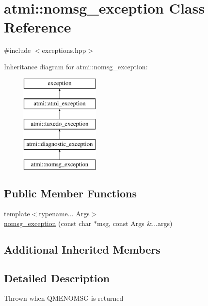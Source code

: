 \hypertarget{classatmi_1_1nomsg__exception}{\section{atmi\+:\+:nomsg\+\_\+exception Class Reference}
\label{classatmi_1_1nomsg__exception}
}


{\ttfamily \#include $<$exceptions.\+hpp$>$}

Inheritance diagram for atmi\+:\+:nomsg\+\_\+exception\+:\begin{figure}[H]
\begin{center}
\leavevmode
\includegraphics[height=5.000000cm]{classatmi_1_1nomsg__exception}
\end{center}
\end{figure}
\subsection*{Public Member Functions}
\begin{DoxyCompactItemize}
\item 
{\footnotesize template$<$typename... Args$>$ }\\\hyperlink{classatmi_1_1nomsg__exception_adf4039103c33fa16b63242cb7e129664}{nomsg\+\_\+exception} (const char $\ast$msg, const Args \&...args)
\end{DoxyCompactItemize}
\subsection*{Additional Inherited Members}


\subsection{Detailed Description}
Thrown when Q\+M\+E\+N\+O\+M\+S\+G is returned 

